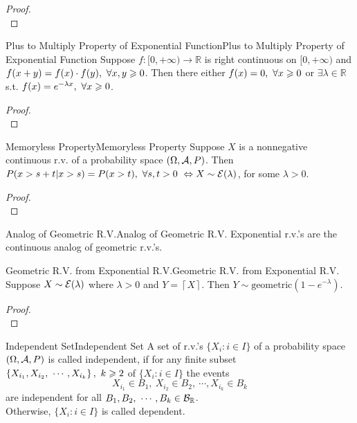 \documentclass{elegantbook}
\begin{document}
\begin{proof}
\\[4cm]\vspace{0.01cm}
\end{proof}

\begin{lemma}{Plus to Multiply Property of Exponential Function}{Plus to Multiply Property of Exponential Function}
Suppose $f:[0,+\infty)\rightarrow\mathbb{R}$ is right continuous on $[0,+\infty)$ and $f(x+y)=f(x)\cdot f(y),\ \forall x,y\geqslant0$. Then there either $f(x)=0,\ \forall x\gs0$ or $\exists\lambda\in\mathbb{R}$ s.t. $f(x)=e^{-\lambda x},\ \forall x\geqslant0$.
\end{lemma}

\begin{proof}
\\[4cm]\vspace{0.01cm}
\end{proof}

\begin{theorem}{Memoryless Property}{Memoryless Property}
Suppose $X$ is a nonnegative continuous r.v. of a probability space $(\Omega,\mathcal{A}, P)$. Then $P(x>s+t| x>s)=P(x>t),\ \forall s,t>0\ \Leftrightarrow X\sim\me(\lambda)$, for some $\lambda>0$.
\end{theorem}

\begin{proof}
\\[4cm]\vspace{0.01cm}
\end{proof}

\begin{remark}{Analog of Geometric R.V.}{Analog of Geometric R.V.}
Exponential r.v.'s are the continuous analog of geometric r.v.'s.
\end{remark}

\begin{theorem}{Geometric R.V. from Exponential R.V.}{Geometric R.V. from Exponential R.V.}
Suppose $X\sim\mathcal{E}(\lambda)$ where $\lambda>0$ and $Y=\left\lceil X\right\rceil$. Then $Y\sim\mathrm{geometric}\left(1-e^{-\lambda}\right)$.
\end{theorem}

\begin{proof}
\\[4cm]\vspace{0.01cm}
\end{proof}

\begin{definition}{Independent Set}{Independent Set}
A set of r.v.'s $\{X_i:i\in I\}$ of a probability space $(\Omega,\mathcal{A}, P)$ is called independent, if for any finite subset $\left\{X_{i_1},X_{i_2},\ \cdots,X_{i_k}\right\},\ k\gs2$ of $\{X_i:i\in I\}$ the events
$$
X_{i_1}\in B_1,\ X_{i_2}\in B_2,\ \cdots,X_{i_k}\in B_k
$$
are independent for all $B_1,B_2,\ \cdots,B_k\in\mb_\mathbb{R}$.\\
Otherwise, $\{X_i:i\in I\}$ is called dependent.
\end{definition}
\end{document}
